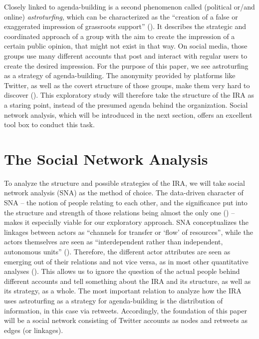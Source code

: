 \documentclass[12pt, titlepage=true, toc=bib]{scrartcl}
\begin{document}
Closely linked to agenda-building is a second phenomenon called (political or/and online) \textit{astroturfing}, which can be characterized as the ``creation of a false or exaggerated impression of grassroots support'' (\cite{harcup_astroturfing_2014}). It describes the strategic and coordinated approach of a group with the aim to create the impression of a certain public opinion, that might not exist in that way. On social media, those groups use many different accounts that post and interact with regular users to create the desired impression. For the purpose of this paper, we see astroturfing as a strategy of agenda-building. The anonymity provided by platforms like Twitter, as well as the covert structure of those groups, make them very hard to discover (\cite[564]{yang_how_2017}). This exploratory study will therefore take the structure of the IRA as a staring point, instead of the presumed agenda behind the organization. Social network analysis, which will be introduced in the next section, offers an excellent tool box to conduct this task.


\section{The Social Network Analysis}

To analyze the structure and possible strategies of the IRA, we will take social network analysis (SNA) as the method of choice. The data-driven character of SNA -- the notion of people relating to each other, and the significance put into the structure and strength of those relations being almost the only one (\cite[982]{golovchenko_state_2018}) -- makes it especially viable for our exploratory approach. SNA conceptualizes the linkages between actors as \enquote{channels for transfer or \enquote{flow} of resources}, while the actors themselves are seen as ``interdependent rather than independent, autonomous units'' (\cite[4]{wasserman_social_1994}). Therefore, the different actor attributes are seen as emerging out of their relations and not vice versa, as in most other quantitative analyses (\cite[8]{wasserman_social_1994}). This allows us to ignore the question of the actual people behind different accounts and tell something about the IRA and its structure, as well as its strategy, as a whole. The most important relation to analyze how the IRA uses astroturfing as a strategy for agenda-building is the distribution of information, in this case via retweets. Accordingly, the foundation of this paper will be a social network consisting of Twitter accounts as nodes and retweets as edges (or linkages).
\end{document}
